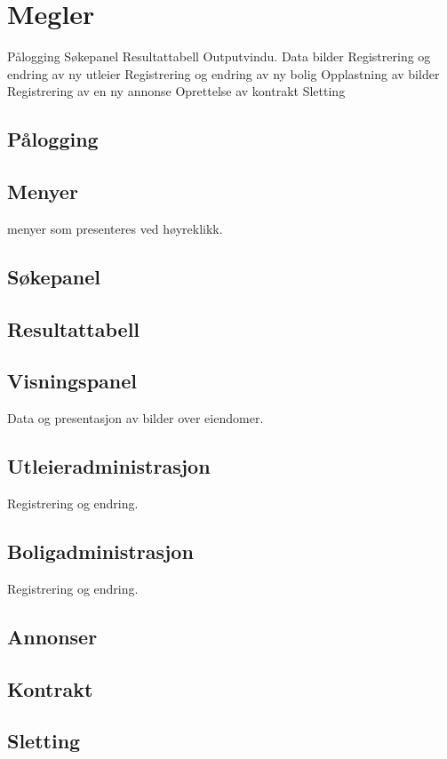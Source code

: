 \section{Megler}

Pålogging
Søkepanel
Resultattabell
Outputvindu. Data bilder
Registrering og endring av ny utleier
Registrering og endring av ny bolig
Opplastning av bilder
Registrering av en ny annonse
Oprettelse av kontrakt
Sletting

\subsection{Pålogging}
\subsection{Menyer}
menyer som presenteres ved høyreklikk. 
\subsection{Søkepanel}
\subsection{Resultattabell}
\subsection{Visningspanel}
Data og presentasjon av bilder over eiendomer.
\subsection{Utleieradministrasjon}
Registrering og endring.
\subsection{Boligadministrasjon}
Registrering og endring.
\subsection{Annonser}
\subsection{Kontrakt}
\subsection{Sletting}